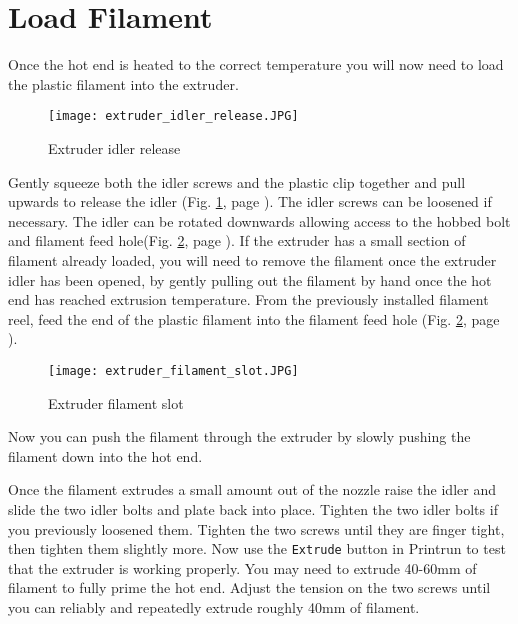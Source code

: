 \section{Load Filament}

Once the hot end is heated to the correct temperature you will now need to load the plastic filament into the extruder.
\begin{figure}[hbt]
\centering
\texttt{[image: extruder\_idler\_release.JPG]}
\caption{Extruder idler release}
\label{fig:extruder_idler_release}
\end{figure}
Gently squeeze both the idler screws and the plastic clip together and pull upwards to release the idler (Fig. \ref{fig:extruder_idler_release}, page \pageref{fig:extruder_idler_release}). The idler screws can be loosened if necessary. The idler can be rotated downwards allowing access to the hobbed bolt and filament feed hole(Fig. \ref{fig:extruder_filament_slot}, page \pageref{fig:extruder_filament_slot}). If the extruder has a small section of filament already loaded, you will need to remove the filament once the extruder idler has been opened, by gently pulling out the filament by hand once the hot end has reached extrusion temperature. From the previously installed filament reel, feed the end of the plastic filament into the filament feed hole
(Fig. \ref{fig:extruder_filament_slot}, page \pageref{fig:extruder_filament_slot}).
\begin{figure}[hbt]
\centering
\texttt{[image: extruder\_filament\_slot.JPG]}
\caption{Extruder filament slot}
\label{fig:extruder_filament_slot}
\end{figure}
Now you can push the filament through the extruder by slowly pushing the filament down into the hot end.

Once the filament extrudes a small amount out of the nozzle raise the idler and slide the two idler bolts and plate back into place. Tighten the two idler bolts if you previously loosened them. Tighten the two screws until they are finger tight, then tighten them slightly more. Now use the \texttt{Extrude} button in Printrun to test that the extruder is working properly. You may need to extrude 40-60mm of filament to fully prime the hot end. Adjust the tension on the two screws until you can reliably and repeatedly extrude roughly 40mm of filament.


